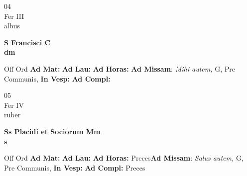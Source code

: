\documentclass[10pt, openany]{book}
\begin{document}
        \begin{center}
            \begin{minipage}{3.5in}
                \vspace{2em}
                \begin{minipage}{0.5in}
                    {\Huge 04} \\
                    {\normalsize Fer III} \\
                    {\normalsize albus}
                \end{minipage}
                \begin{minipage}{3.0in}
                    \textbf{ \large S Francisci C \\
                    \textnormal{\normalsize dm}} \\ 
                \end{minipage}
                \begin{justify}Off Ord
                    \textbf{Ad Mat: }
                    \textbf{Ad Lau: }
                    \textbf{Ad Horas: }\textbf{Ad Missam}: \textit{Mihi autem,} G, Pre Communis,  
                    \textbf{In Vesp: }
                    \textbf{Ad Compl: }
                \end{justify}
            \end{minipage}
        \end{center}
    
        \begin{center}
            \begin{minipage}{3.5in}
                \vspace{2em}
                \begin{minipage}{0.5in}
                    {\Huge 05} \\
                    {\normalsize Fer IV} \\
                    {\normalsize ruber}
                \end{minipage}
                \begin{minipage}{3.0in}
                    \textbf{ \large Ss Placidi et Sociorum Mm \\
                    \textnormal{\normalsize s}} \\ 
                \end{minipage}
                \begin{justify}Off Ord
                    \textbf{Ad Mat: }
                    \textbf{Ad Lau: }
                    \textbf{Ad Horas: }Preces\textbf{Ad Missam}: \textit{Salus autem,} G, Pre Communis,  
                    \textbf{In Vesp: }
                    \textbf{Ad Compl: }Preces
                \end{justify}
            \end{minipage}
        \end{center}
    
\end{document}
